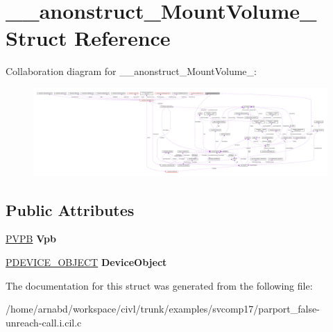 \hypertarget{struct____anonstruct__MountVolume__67}{}\section{\+\_\+\+\_\+anonstruct\+\_\+\+Mount\+Volume\+\_ Struct Reference}
\label{struct____anonstruct__MountVolume__67}


Collaboration diagram for \+\_\+\+\_\+anonstruct\+\_\+\+Mount\+Volume\+\_\+:
\nopagebreak
\begin{figure}[H]
\begin{center}
\leavevmode
\includegraphics[width=350pt]{struct____anonstruct__MountVolume__67__coll__graph}
\end{center}
\end{figure}
\subsection*{Public Attributes}
\begin{DoxyCompactItemize}
\item 
\hypertarget{struct____anonstruct__MountVolume__67_ab6a9038d1f9464936f628849d34dc57f}{}\hyperlink{struct__VPB}{P\+V\+P\+B} {\bfseries Vpb}\label{struct____anonstruct__MountVolume__67_ab6a9038d1f9464936f628849d34dc57f}

\item 
\hypertarget{struct____anonstruct__MountVolume__67_a9ae666eb85786118f20fd9085101bb84}{}\hyperlink{struct__DEVICE__OBJECT}{P\+D\+E\+V\+I\+C\+E\+\_\+\+O\+B\+J\+E\+C\+T} {\bfseries Device\+Object}\label{struct____anonstruct__MountVolume__67_a9ae666eb85786118f20fd9085101bb84}

\end{DoxyCompactItemize}


The documentation for this struct was generated from the following file\+:\begin{DoxyCompactItemize}
\item 
/home/arnabd/workspace/civl/trunk/examples/svcomp17/parport\+\_\+false-\/unreach-\/call.\+i.\+cil.\+c\end{DoxyCompactItemize}
